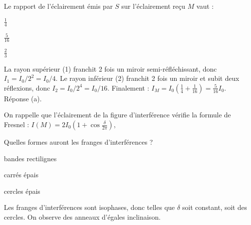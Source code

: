 


\begin{enonce}
	Le rapport de l'éclairement émis par $S$ sur l'éclairement reçu $M$ vaut  : 
	
	\begin{listeQCM3Colonnes}
	\item $\frac{1}{4}$
	\item $\frac{5}{16}$
	\item $\frac{2}{3}$
	\end{listeQCM3Colonnes}

\end{enonce}

\reponse{\reponseB{}}

\begin{corrige}
	La rayon supérieur (1) franchit 2 fois un miroir semi-réfléchissant, donc $I_1=I_0/2^2=I_0/4$. Le rayon inférieur (2) franchit 2 fois un miroir et subit deux réflexions, donc $I_2=I_0/2^4=I_0/16$. Finalement : $I_M=I_0 \left(\frac{1}{4} + \frac{1}{16}\right)=\frac{5}{16} I_0$. Réponse (a).
\end{corrige}





On rappelle que l'éclairement de la figure d'interférence vérifie la formule de Fresnel : $I\left(M\right)=2I_0 \left(1 + \cos \frac{\delta}{2\pi} \right)$,

\begin{enonce}
	 Quelles formes auront les franges d'interférences ?
	
	\begin{listeQCM3Colonnes}
	\item bandes rectilignes
	\item carrés épais
	\item cercles épais
	\end{listeQCM3Colonnes}

\end{enonce}

\reponse{\reponseC{}}

\begin{corrige}
	Les franges d'interférences sont isophases, donc telles que $\delta$ soit constant, soit des cercles. On observe des anneaux d'égales inclinaison.
\end{corrige}

